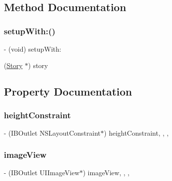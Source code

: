 \subsection{Method Documentation}
\hypertarget{interface_story_table_view_cell_a2a9abe025f50c495bc61fe0671afec91}{}\label{interface_story_table_view_cell_a2a9abe025f50c495bc61fe0671afec91} 
\subsubsection{\texorpdfstring{setup\+With\+:()}{setupWith:()}}
{\footnotesize\ttfamily -\/ (void) setup\+With\+: \begin{DoxyParamCaption}\item[{(\hyperlink{interface_story}{Story} $\ast$)}]{story }\end{DoxyParamCaption}}



\subsection{Property Documentation}
\hypertarget{interface_story_table_view_cell_ac0b115430ddf0baf14a2f6865222a534}{}\label{interface_story_table_view_cell_ac0b115430ddf0baf14a2f6865222a534} 
\subsubsection{\texorpdfstring{height\+Constraint}{heightConstraint}}
{\footnotesize\ttfamily -\/ (I\+B\+Outlet N\+S\+Layout\+Constraint$\ast$) height\+Constraint\hspace{0.3cm}{\ttfamily [read]}, {\ttfamily [write]}, {\ttfamily [nonatomic]}, {\ttfamily [weak]}}

\hypertarget{interface_story_table_view_cell_a8a4a2e33924e723282d9d50a75c28836}{}\label{interface_story_table_view_cell_a8a4a2e33924e723282d9d50a75c28836} 
\subsubsection{\texorpdfstring{image\+View}{imageView}}
{\footnotesize\ttfamily -\/ (I\+B\+Outlet U\+I\+Image\+View$\ast$) image\+View\hspace{0.3cm}{\ttfamily [read]}, {\ttfamily [write]}, {\ttfamily [nonatomic]}, {\ttfamily [weak]}}

